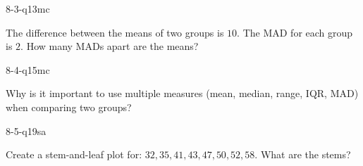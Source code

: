 \begin{practiceQuestion}{8-3-q13}{mc}
\begin{questionText}
The difference between the means of two groups is $10$. The MAD for each group is $2$. How many MADs apart are the means?
\end{questionText}
\end{practiceQuestion}

\begin{practiceQuestion}{8-4-q15}{mc}
\begin{questionText}
Why is it important to use multiple measures (mean, median, range, IQR, MAD) when comparing two groups?
\end{questionText}
\end{practiceQuestion}

\begin{practiceQuestion}{8-5-q19}{sa}
\begin{questionText}
Create a stem-and-leaf plot for: $32, 35, 41, 43, 47, 50, 52, 58$. What are the stems?
\end{questionText}
\end{practiceQuestion}

